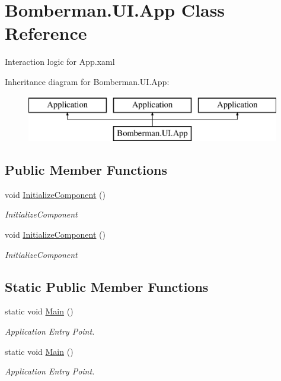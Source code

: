 \hypertarget{class_bomberman_1_1_u_i_1_1_app}{}\section{Bomberman.\+U\+I.\+App Class Reference}
\label{class_bomberman_1_1_u_i_1_1_app}


Interaction logic for App.\+xaml  


Inheritance diagram for Bomberman.\+U\+I.\+App\+:\begin{figure}[H]
\begin{center}
\leavevmode
\includegraphics[height=2.000000cm]{class_bomberman_1_1_u_i_1_1_app}
\end{center}
\end{figure}
\subsection*{Public Member Functions}
\begin{DoxyCompactItemize}
\item 
void \mbox{\hyperlink{class_bomberman_1_1_u_i_1_1_app_ae3504e2ca42f1397b3fec22278c55cfe}{Initialize\+Component}} ()
\begin{DoxyCompactList}\small\item\em Initialize\+Component \end{DoxyCompactList}\item 
void \mbox{\hyperlink{class_bomberman_1_1_u_i_1_1_app_ae3504e2ca42f1397b3fec22278c55cfe}{Initialize\+Component}} ()
\begin{DoxyCompactList}\small\item\em Initialize\+Component \end{DoxyCompactList}\end{DoxyCompactItemize}
\subsection*{Static Public Member Functions}
\begin{DoxyCompactItemize}
\item 
static void \mbox{\hyperlink{class_bomberman_1_1_u_i_1_1_app_af5ecd868927d677838c13790bbec91be}{Main}} ()
\begin{DoxyCompactList}\small\item\em Application Entry Point. \end{DoxyCompactList}\item 
static void \mbox{\hyperlink{class_bomberman_1_1_u_i_1_1_app_af5ecd868927d677838c13790bbec91be}{Main}} ()
\begin{DoxyCompactList}\small\item\em Application Entry Point. \end{DoxyCompactList}\end{DoxyCompactItemize}


